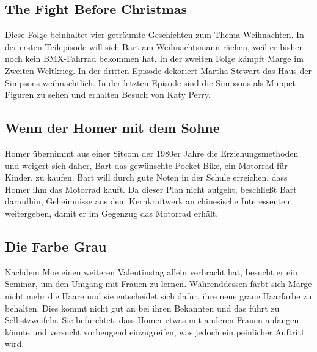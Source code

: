 
\subsection{The Fight Before Christmas}
Diese Folge beinhaltet vier geträumte Geschichten zum Thema Weihnachten. In der ersten Teilepisode will sich Bart am Weihnachtsmann rächen, weil er bisher noch kein BMX-Fahrrad bekommen hat. In der zweiten Folge kämpft Marge im Zweiten Weltkrieg. In der dritten Episode dekoriert Martha Stewart das Haus der Simpsons weihnachtlich. In der letzten Episode sind die Simpsons als Muppet-Figuren zu sehen und erhalten Besuch von Katy Perry.


\subsection{Wenn der Homer mit dem Sohne}
Homer übernimmt aus einer Sitcom der 1980er Jahre die Erziehungsmethoden und weigert sich daher, Bart das gewünschte Pocket Bike, ein Motorrad für Kinder, zu kaufen. Bart will durch gute Noten in der Schule erreichen, dass Homer ihm das Motorrad kauft. Da dieser Plan nicht aufgeht, beschließt Bart daraufhin, Geheimnisse aus dem Kernkraftwerk an chinesische Interessenten weitergeben, damit er im Gegenzug das Motorrad erhält. 


\subsection{Die Farbe Grau}\label{NABF06}
Nachdem Moe einen weiteren Valentinstag allein verbracht hat, besucht er ein Seminar, um den Umgang mit Frauen zu lernen. Währenddessen färbt sich Marge nicht mehr die Haare und sie entscheidet sich dafür, ihre neue graue Haarfarbe zu behalten. Dies kommt nicht gut an bei ihren Bekannten und das führt zu Selbstzweifeln. Sie befürchtet, dass Homer etwas mit anderen Frauen anfangen könnte und versucht vorbeugend einzugreifen, was jedoch ein peinlicher Auftritt wird. 

